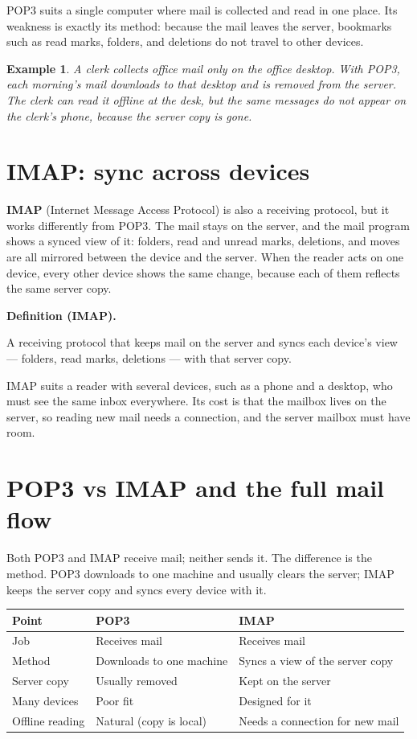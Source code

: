 \documentclass[11pt]{article}
\newtheorem{example}{Example}[section]
\newenvironment{definitionbox}[1]{%
  \par\noindent\textbf{Definition (#1).}\ \itshape
}{\par\vspace{0.3em}}
\begin{document}
POP3 suits a single computer where mail is collected and read in one place.
Its weakness is exactly its method: because the mail leaves the server,
bookmarks such as read marks, folders, and deletions do not travel to other
devices.

\begin{example}
A clerk collects office mail only on the office desktop. With POP3, each
morning's mail downloads to that desktop and is removed from the server.
The clerk can read it offline at the desk, but the same messages do not
appear on the clerk's phone, because the server copy is gone.
\end{example}

\section{IMAP: sync across devices}
\textbf{IMAP} (Internet Message Access Protocol) is also a receiving
protocol, but it works differently from POP3. The mail stays on the
server, and the mail program shows a synced view of it: folders, read and
unread marks, deletions, and moves are all mirrored between the device and
the server. When the reader acts on one device, every other device shows
the same change, because each of them reflects the same server copy.

\begin{definitionbox}{IMAP}
A receiving protocol that keeps mail on the server and syncs each device's
view --- folders, read marks, deletions --- with that server copy.
\end{definitionbox}

IMAP suits a reader with several devices, such as a phone and a desktop,
who must see the same inbox everywhere. Its cost is that the mailbox lives
on the server, so reading new mail needs a connection, and the server
mailbox must have room.

\section{POP3 vs IMAP and the full mail flow}
Both POP3 and IMAP receive mail; neither sends it. The difference is the
method. POP3 downloads to one machine and usually clears the server; IMAP
keeps the server copy and syncs every device with it.

\begin{center}
\begin{tabular}{p{}p{}p{}}
\toprule
\textbf{Point} & \textbf{POP3} & \textbf{IMAP} \\
\midrule
Job & Receives mail & Receives mail \\
Method & Downloads to one machine & Syncs a view of the server copy \\
Server copy & Usually removed & Kept on the server \\
Many devices & Poor fit & Designed for it \\
Offline reading & Natural (copy is local) & Needs a connection for new mail \\
\bottomrule
\end{tabular}
\end{center}
\end{document}
